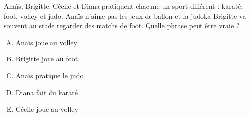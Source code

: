 Anaïs, Brigitte, Cécile et Diana pratiquent chacune un sport différent : karaté, foot, volley
et judo. Anaïs n'aime pas les jeux de ballon et la judoka Brigitte va
souvent au stade regarder des matchs de foot. Quelle phrase peut être
vraie ?
\begin{multicols}{3}
  \begin{enumerate}[A)]
  \item Anaïs joue au volley
  \item Brigitte joue au foot
  \item Anaïs pratique le judo
  \item Diana fait du karaté
  \item Cécile joue au volley
  \end{enumerate}
\end{multicols}